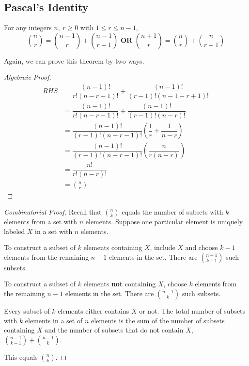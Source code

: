 \subsection{Pascal's Identity}
\begin{theorem}
	For any integers \(n,\ r \geq 0\) with \(1 \leq r \leq n-1\),
	\[
		\binom{n}{r} = \binom{n-1}{r} + \binom{n-1}{r-1} \mathbf{\text{ OR }} \binom{n+1}{r} = \binom{n}{r} + \binom{n}{r-1}
	\]  
\end{theorem}

Again, we can prove this theorem by two ways.

\begin{proof}[Algebraic Proof]
	\[
		\begin{aligned}
			RHS &= \dfrac{(n-1)!}{r!(n-r-1)!} + \dfrac{(n-1)!}{(r-1)!(n-1-r+1)!} \\
			&= \dfrac{(n-1)!}{r!(n-r-1)!} + \dfrac{(n-1)!}{(r-1)!(n-r)!} \\
			&= \dfrac{(n-1)!}{(r-1)!(n-r-1)!} \left(\dfrac{1}{r} + \dfrac{1}{n-r}\right) \\
			&= \dfrac{(n-1)!}{(r-1)!(n-r-1)!} \left(\dfrac{n}{r(n-r)}\right) \\
			&= \dfrac{n!}{r!(n-r)!} \\
			&= \binom{n}{r}
		\end{aligned}
	\]
\end{proof}

\begin{proof}[Combinatorial Proof] 
	Recall that \(\binom{n}{k}\) equals the number of subsets with \(k\) elements from a set with \(n\) elements. Suppose one particular element is uniquely labeled \(X\) in a set with \(n\) elements.
	
	To construct a subset of \(k\) elements containing \(X\), include \(X\) and choose \(k-1\) elements from the remaining \(n-1\) elements in the set. There are \(\binom{n-1}{k-1}\) such subsets.

	To construct a subset of \(k\) elements \textbf{not} containing \(X\), choose \(k\) elements from the remaining \(n-1\) elements in the set. There are \(\binom{n-1}{k}\) such subsets.

	Every subset of \(k\) elements either contains \(X\) or not. The total number of subsets with \(k\) elements in a set of \(n\) elements is the sum of the number of subsets containing \(X\) and the number of subsets that do not contain \(X\), \(\binom{n-1}{k-1} + \binom{n-1}{k}\).

	This equals \(\binom{n}{k}\).
\end{proof}


